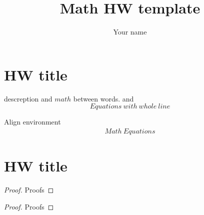 \documentclass[12pt]{article}
\title{Math HW template}
\author{Your name}
\begin{document}
\pagestyle{fancy}
\maketitle

\rhead{\today}
\newpage
\section{HW title}
descreption and $math$ between words. 
and
\[
        Equations\ with\ whole\ line 
\]

Align environment
\begin{align*}
Math\ Equations
\end{align*}

\section{HW title}
 
\begin{proof}
    Proofs
\end{proof}

\begin{proof} 
    Proofs
\end{proof}

 
\end{document}
